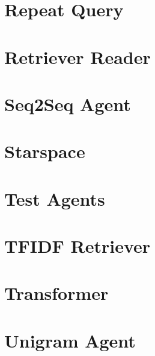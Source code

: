 \documentclass[twoside]{book}
\newcommand{\+}{\discretionary{\mbox{\scriptsize$\hookleftarrow$}}{}{}}
\begin{document}
\chapter{Repeat Query}
\label{md_parlai_agents_repeat_query_README}

\chapter{Retriever Reader}
\label{md_parlai_agents_retriever_reader_README}

\chapter{Seq2\+Seq Agent}
\label{md_parlai_agents_seq2seq_README}

\chapter{Starspace}
\label{md_parlai_agents_starspace_README}

\chapter{Test Agents}
\label{md_parlai_agents_test_agents_README}

\chapter{T\+F\+I\+DF Retriever}
\label{md_parlai_agents_tfidf_retriever_README}

\chapter{Transformer}
\label{md_parlai_agents_transformer_README}

\chapter{Unigram Agent}
\label{md_parlai_agents_unigram_README}

\end{document}

